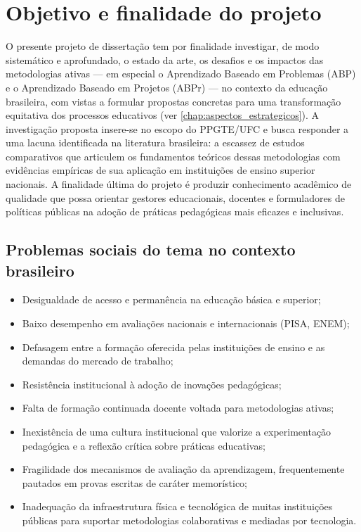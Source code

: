 \section{Objetivo e finalidade do projeto}
\label{sec:objetivo_finalidade}

O presente projeto de dissertação tem por finalidade investigar, de modo sistemático e aprofundado, o estado da arte, os desafios e os impactos das metodologias ativas — em especial o Aprendizado Baseado em Problemas (ABP) e o Aprendizado Baseado em Projetos (ABPr) — no contexto da educação brasileira, com vistas a formular propostas concretas para uma transformação equitativa dos processos educativos (ver \ref{chap:aspectos_estrategicos}). A investigação proposta insere-se no escopo do PPGTE/UFC e busca responder a uma lacuna identificada na literatura brasileira: a escassez de estudos comparativos que articulem os fundamentos teóricos dessas metodologias com evidências empíricas de sua aplicação em instituições de ensino superior nacionais. A finalidade última do projeto é produzir conhecimento acadêmico de qualidade que possa orientar gestores educacionais, docentes e formuladores de políticas públicas na adoção de práticas pedagógicas mais eficazes e inclusivas.

\subsection{Problemas sociais do tema no contexto brasileiro}
\label{subsec:problemas_sociais}

\begin{itemize}
    \item Desigualdade de acesso e permanência na educação básica e superior;
    \item Baixo desempenho em avaliações nacionais e internacionais (PISA, ENEM);
    \item Defasagem entre a formação oferecida pelas instituições de ensino e as demandas do mercado de trabalho;
    \item Resistência institucional à adoção de inovações pedagógicas;
    \item Falta de formação continuada docente voltada para metodologias ativas;
    \item Inexistência de uma cultura institucional que valorize a experimentação pedagógica e a reflexão crítica sobre práticas educativas;
    \item Fragilidade dos mecanismos de avaliação da aprendizagem, frequentemente pautados em provas escritas de caráter memorístico;
    \item Inadequação da infraestrutura física e tecnológica de muitas instituições públicas para suportar metodologias colaborativas e mediadas por tecnologia.
\end{itemize}

